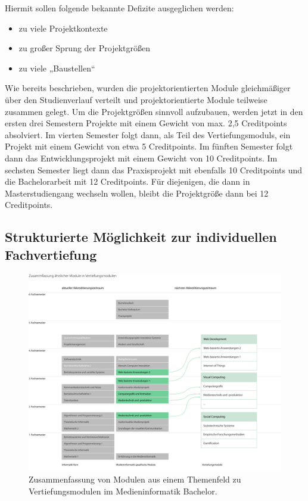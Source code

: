 Hiermit sollen folgende bekannte Defizite ausgeglichen werden:

\begin{itemize}
\tightlist
\item
  zu viele Projektkontexte
\item
  zu großer Sprung der Projektgrößen
\item
  zu viele „Baustellen``
\end{itemize}

Wie bereits beschrieben, wurden die projektorientierten Module
gleichmäßiger über den Studienverlauf verteilt und projektorientierte
Module teilweise zusammen gelegt. Um die Projektgrößen sinnvoll
aufzubauen, werden jetzt in den ersten drei Semestern Projekte mit einem
Gewicht von max. 2,5 Creditpoints absolviert. Im vierten Semester folgt
dann, als Teil des Vertiefungsmoduls, ein Projekt mit einem Gewicht von
etwa 5 Creditpoints. Im fünften Semester folgt dann das
Entwicklungsprojekt mit einem Gewicht von 10 Creditpoints. Im sechsten
Semester liegt dann das Praxisprojekt mit ebenfalls 10 Creditpoints und
die Bachelorarbeit mit 12 Creditpoints. Für diejenigen, die dann in
Masterstudiengang wechseln wollen, bleibt die Projektgröße dann bei 12
Creditpoints.

\subsection{Strukturierte Möglichkeit zur individuellen
Fachvertiefung}\label{strukturierte-muxf6glichkeit-zur-individuellen-fachvertiefung}

\begin{figure}[htbp]
\centering
\includegraphics[width=\columnwidth]{../anhaenge/bilder/ba-vertiefungen.png}
\caption{Zusammenfassung von Modulen aus einem Themenfeld zu
Vertiefungsmodulen im Medieninformatik Bachelor.}
\end{figure}

